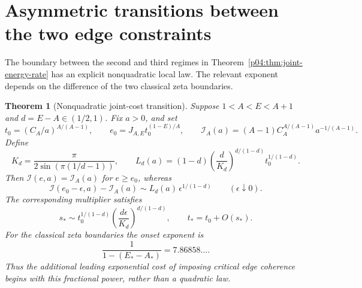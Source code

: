 \documentclass[11pt,letterpaper]{article}
\newtheorem{theorem}{Theorem}[section]
\theoremstyle{definition}
\theoremstyle{remark}
\newcommand{\1}{\mathbf 1}
\begin{document}
\section{Asymmetric transitions between the two edge constraints}
\label{p04:sec:joint-transition}

The boundary between the second and third regimes in
Theorem~\ref{p04:thm:joint-energy-rate} has an explicit nonquadratic
local law. The relevant exponent depends on the difference of the
two classical zeta boundaries.

\begin{theorem}[Nonquadratic joint-cost transition]
\label{p04:thm:nonquadratic-transition}
Suppose $1<A<E<A+1$ and $d=E-A\in(1/2,1)$. Fix $a>0$, and set
\[
 t_0=(C_A/a)^{A/(A-1)},\qquad
 e_0=J_{A,E}t_0^{(1-E)/A},\qquad
 \mathcal I_A(a)=(A-1)C_A^{A/(A-1)}a^{-1/(A-1)}.
\]
Define
\[
 K_d=\frac{\pi}{2\sin(\pi(1/d-1))},\qquad
 L_d(a)=(1-d)\left(\frac d{K_d}\right)^{d/(1-d)}
                     t_0^{1/(1-d)}.
\]
Then $\mathcal I(e,a)=\mathcal I_A(a)$ for $e\ge e_0$, whereas
\begin{equation}\label{p04:eq:nonquadratic-transition}
 \mathcal I(e_0-\epsilon,a)-\mathcal I_A(a)
 \sim L_d(a)\,\epsilon^{1/(1-d)}
 \qquad(\epsilon\downarrow0).
\end{equation}
The corresponding multiplier satisfies
\begin{equation}\label{p04:eq:transition-saddle}
 s_*\sim t_0^{1/(1-d)}
               \left(\frac{d\epsilon}{K_d}\right)^{d/(1-d)},
 \qquad t_*=t_0+O(s_*).
\end{equation}
For the classical zeta boundaries the onset exponent is
\[
 \frac1{1-(E_*-A_*)}=7.86858\ldots.
\]
Thus the additional leading exponential cost of imposing critical
edge coherence begins with this fractional power, rather than a
quadratic law.
\end{theorem}
\end{document}
